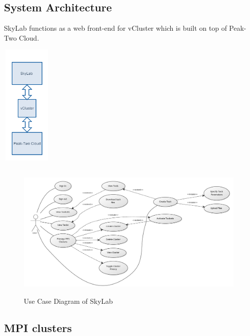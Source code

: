 \subsection{System Architecture}
SkyLab functions as a web front-end for vCluster which is built on top of Peak-Two Cloud.
	\begin{center}			
		\includegraphics[width=92px,height=224px]{./images/system_architecture.png}			
	\end{center}	
    



	
    \begin{figure}[ht]
      \centering
      \includegraphics[width=500px,height=250px]{./images/use_case_large.png}
      \caption{Use Case Diagram of SkyLab}\label{System Architecture}
    \end{figure}

\subsection{MPI clusters} 

